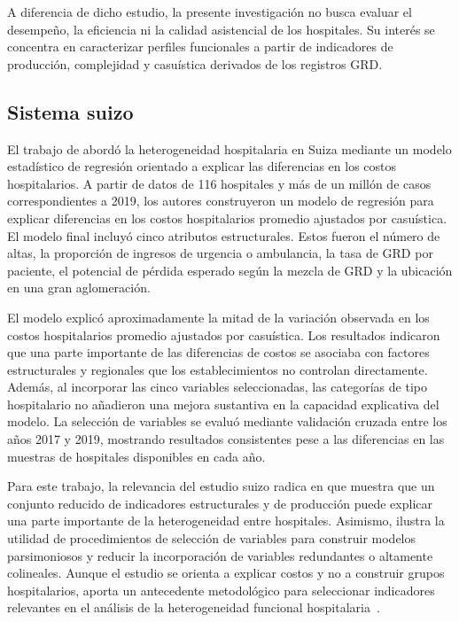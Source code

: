 A diferencia de dicho estudio, la presente investigación no busca evaluar el
desempeño, la eficiencia ni la calidad asistencial de los hospitales. Su interés
se concentra en caracterizar perfiles funcionales a partir de indicadores de
producción, complejidad y casuística derivados de los registros GRD.

\subsection{Sistema suizo}

\label{sec:suiza}

El trabajo de \citet{Havranek2023} abordó la heterogeneidad hospitalaria en
Suiza mediante un modelo estadístico de regresión orientado a explicar las
diferencias en los costos hospitalarios. A partir de datos de 116 hospitales y
más de un millón de casos correspondientes a 2019, los autores construyeron un
modelo de regresión para explicar diferencias en los costos hospitalarios
promedio ajustados por casuística. El modelo final incluyó cinco
atributos estructurales. Estos fueron el número de altas, la proporción de
ingresos de urgencia o ambulancia, la tasa de GRD por paciente, el potencial de
pérdida esperado según la mezcla de GRD y la ubicación en una gran aglomeración.

El modelo explicó aproximadamente la mitad de la variación observada en los
costos hospitalarios promedio ajustados por casuística. Los resultados indicaron
que una parte importante de las diferencias de costos se asociaba con factores
estructurales y regionales que los establecimientos no controlan directamente.
Además, al incorporar las cinco variables seleccionadas, las categorías de tipo
hospitalario no añadieron una mejora sustantiva en la capacidad explicativa del
modelo. La selección de variables se evaluó mediante validación cruzada entre
los años 2017 y 2019, mostrando resultados consistentes pese a las diferencias
en las muestras de hospitales disponibles en cada año.

Para este trabajo, la relevancia del estudio suizo radica en que muestra que un
conjunto reducido de indicadores estructurales y de producción puede explicar
una parte importante de la heterogeneidad entre hospitales. Asimismo, ilustra
la utilidad de procedimientos de selección de variables para construir modelos
parsimoniosos y reducir la incorporación de variables redundantes o altamente
colineales. Aunque el estudio se orienta a explicar costos y no a construir
grupos hospitalarios, aporta un antecedente metodológico para seleccionar
indicadores relevantes en el análisis de la heterogeneidad funcional
hospitalaria~\citep{Havranek2023}.

